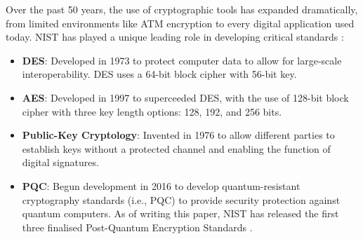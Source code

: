Over the past 50 years, the use of cryptographic tools has expanded dramatically, from limited environments like \gls{ATM} encryption to every digital application used today. 
\Gls{NIST} has played a unique leading role in developing critical standards \cite{chen2022cornerstone}:
\begin{itemize}
    \item \textbf{\Gls{DES}}: Developed in 1973 to protect computer data to allow for large-scale interoperability. \Gls{DES} uses a 64-bit block cipher with 56-bit key.
    \item \textbf{\Gls{AES}}: Developed in 1997 to superceeded \gls{DES}, with the use of 128-bit block cipher with three key length options: 128, 192, and 256 bits. 
    \item \textbf{Public-Key Cryptology}: Invented in 1976 to allow different parties to establish keys without a protected channel and enabling the function of digital signatures. 
    \item \textbf{\Gls{PQC}}: Begun development in 2016 to develop quantum-resistant cryptography standards (i.e., \gls{PQC}) to provide security protection against quantum computers. As of writing this paper, \gls{NIST} has released the first three finalised Post-Quantum Encryption Standards \cite{nist2024postquantum}.
\end{itemize}

